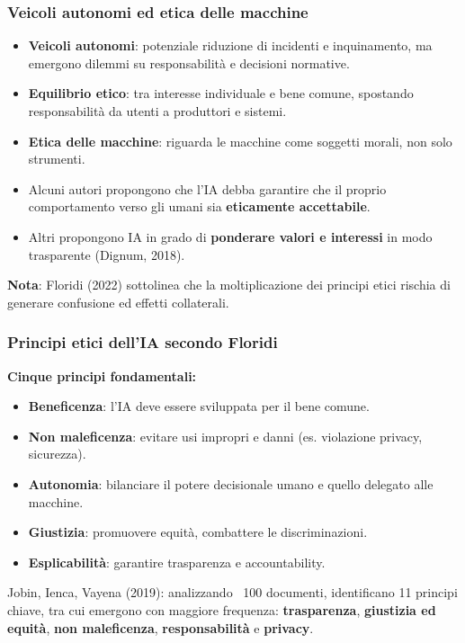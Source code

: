 \documentclass{beamer}
\begin{document}
%
%
\begin{frame}
\frametitle{Veicoli autonomi ed etica delle macchine}

\begin{itemize}
    \item \textbf{Veicoli autonomi}: potenziale riduzione di incidenti e inquinamento, ma emergono dilemmi su responsabilità e decisioni normative.
    \item \textbf{Equilibrio etico}: tra interesse individuale e bene comune, spostando responsabilità da utenti a produttori e sistemi.
    \item \textbf{Etica delle macchine}: riguarda le macchine come soggetti morali, non solo strumenti.
    \item Alcuni autori propongono che l’IA debba garantire che il proprio comportamento verso gli umani sia \textbf{eticamente accettabile}.
    \item Altri propongono IA in grado di \textbf{ponderare valori e interessi} in modo trasparente (Dignum, 2018).
\end{itemize}

\vspace{0.3cm}
{\small
\textbf{Nota}: Floridi (2022) sottolinea che la moltiplicazione dei principi etici rischia di generare confusione ed effetti collaterali.
}

\end{frame}
%
%
\begin{frame}
\frametitle{Principi etici dell’IA secondo Floridi}

\textbf{Cinque principi fondamentali:}
\begin{itemize}
    \item \textbf{Beneficenza}: l’IA deve essere sviluppata per il bene comune.
    \item \textbf{Non maleficenza}: evitare usi impropri e danni (es. violazione privacy, sicurezza).
    \item \textbf{Autonomia}: bilanciare il potere decisionale umano e quello delegato alle macchine.
    \item \textbf{Giustizia}: promuovere equità, combattere le discriminazioni.
    \item \textbf{Esplicabilità}: garantire trasparenza e accountability.
\end{itemize}

\vspace{0.3cm}
{\small
Jobin, Ienca, Vayena (2019): analizzando ~100 documenti, identificano 11 principi chiave, tra cui emergono con maggiore frequenza:
\textbf{trasparenza}, \textbf{giustizia ed equità}, \textbf{non maleficenza}, \textbf{responsabilità} e \textbf{privacy}.
}

\end{frame}
%
\end{document}
